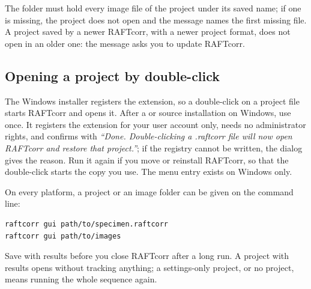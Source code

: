 The folder must hold every image file of the project under its saved name; if one is missing,
the project does not open and the message names the first missing file. A project saved by a
newer RAFTcorr, with a newer project format, does not open in an older one: the message asks you
to update RAFTcorr.

\subsection{Opening a project by double-click}
\label{sec:projects-doubleclick}

The Windows installer registers the  extension, so a double-click on a project
file starts RAFTcorr and opens it. After a  or source installation on Windows, use
 once. It registers the extension for your
user account only, needs no administrator rights, and confirms with \emph{``Done.
Double-clicking a .raftcorr file will now open RAFTcorr and restore that project.''}; if the
registry cannot be written, the dialog  gives the reason. Run it again
if you move or reinstall RAFTcorr, so that the double-click starts the copy you use. The menu
entry exists on Windows only.

On every platform, a project or an image folder can be given on the command line:

\begin{lstlisting}
raftcorr gui path/to/specimen.raftcorr
raftcorr gui path/to/images
\end{lstlisting}

\begin{tipbox}
Save with results before you close RAFTcorr after a long run. A project with results opens
without tracking anything; a settings-only project, or no project, means running the whole
sequence again.
\end{tipbox}
